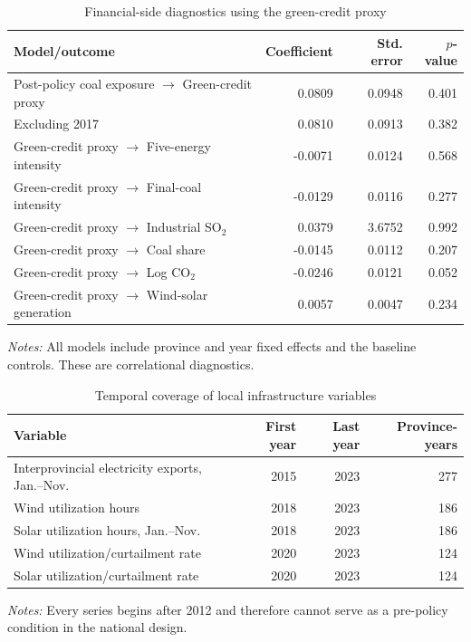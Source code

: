 \documentclass[11pt]{article}
\newcommand{\note}[1]{\begin{minipage}{0.96\textwidth}\footnotesize\textit{Notes:} #1\end{minipage}}
\begin{document}
\begin{table}[H]
\centering
\caption{Financial-side diagnostics using the green-credit proxy}
\begin{tabular}{lrrr}
\toprule
Model/outcome & Coefficient & Std. error & $p$-value \\
\midrule
Post-policy coal exposure $\rightarrow$ Green-credit proxy & 0.0809 & 0.0948 & 0.401 \\
Excluding 2017 & 0.0810 & 0.0913 & 0.382 \\
Green-credit proxy $\rightarrow$ Five-energy intensity & -0.0071 & 0.0124 & 0.568 \\
Green-credit proxy $\rightarrow$ Final-coal intensity & -0.0129 & 0.0116 & 0.277 \\
Green-credit proxy $\rightarrow$ Industrial SO$_2$ & 0.0379 & 3.6752 & 0.992 \\
Green-credit proxy $\rightarrow$ Coal share & -0.0145 & 0.0112 & 0.207 \\
Green-credit proxy $\rightarrow$ Log CO$_2$ & -0.0246 & 0.0121 & 0.052 \\
Green-credit proxy $\rightarrow$ Wind-solar generation & 0.0057 & 0.0047 & 0.234 \\
\bottomrule
\end{tabular}
\note{All models include province and year fixed effects and the baseline controls. These are correlational diagnostics.}
\end{table}

\begin{table}[H]
\centering
\caption{Temporal coverage of local infrastructure variables}
\begin{tabular}{lrrr}
\toprule
Variable & First year & Last year & Province-years \\
\midrule
Interprovincial electricity exports, Jan.--Nov. & 2015 & 2023 & 277 \\
Wind utilization hours & 2018 & 2023 & 186 \\
Solar utilization hours, Jan.--Nov. & 2018 & 2023 & 186 \\
Wind utilization/curtailment rate & 2020 & 2023 & 124 \\
Solar utilization/curtailment rate & 2020 & 2023 & 124 \\
\bottomrule
\end{tabular}
\note{Every series begins after 2012 and therefore cannot serve as a pre-policy condition in the national design.}
\end{table}

\printbibliography[title={References}]
\end{document}
